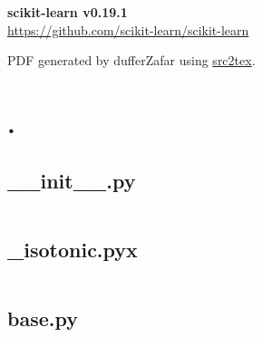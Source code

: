 \documentclass{article}
\begin{document}

\title{}
\author{Shadab Zafar}

\begin{titlepage}
   \begin{center}
    \Huge
    \textbf{scikit-learn v0.19.1} \\


    \LARGE
    \href{https://github.com/scikit-learn/scikit-learn}{https://github.com/scikit-learn/scikit-learn}


    \large
    PDF generated by dufferZafar using \href{http://github.com/dufferzafar/src2tex}{src2tex}.
   \end{center}
\end{titlepage}

\newpage

\tableofcontents
\newpage



\section{.}

\subsection{\_\_init\_\_.py}
\inputminted{python}{/home/dufferzafar/dev/@clones/scikit-learn/sklearn/__init__.py}
\newpage

\subsection{\_isotonic.pyx}
\inputminted{cython}{/home/dufferzafar/dev/@clones/scikit-learn/sklearn/_isotonic.pyx}
\newpage

\subsection{base.py}
\inputminted{python}{/home/dufferzafar/dev/@clones/scikit-learn/sklearn/base.py}
\newpage
\end{document}
